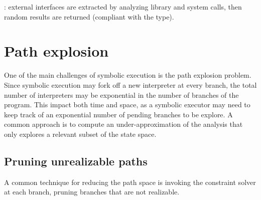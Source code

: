 \cite{DART-PLDI05}: external interfaces are extracted by analyzing library and system calls, then random results are returned (compliant with the type).


\section{Path explosion}

One of the main challenges of symbolic execution is the path explosion problem. Since symbolic execution may fork off a new interpreter at every branch, the total number of interpreters may be exponential in the number of branches of the program. This impact both time and space, as a symbolic executor may need to keep track of an exponential number of pending branches to be explore. A common approach is to compute an under-approximation of the analysis that only explores a relevant subset of the state space.

\subsection{Pruning unrealizable paths}

A common technique for reducing the path space is invoking the constraint solver at each branch, pruning branches that are not realizable. 

